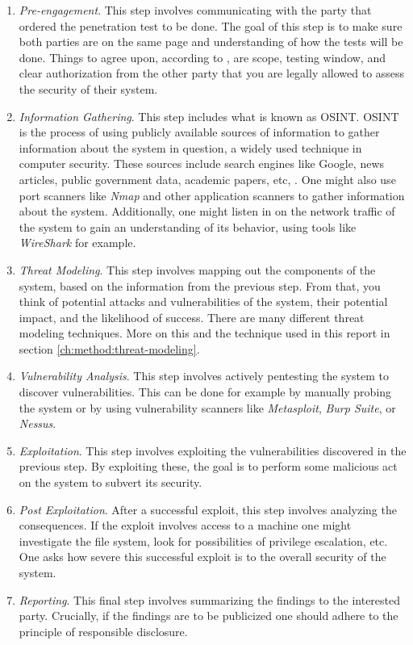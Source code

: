 \begin{enumerate}
    \item \textit{Pre-engagement}. This step involves communicating with the party that ordered the penetration test to be done. The goal of this step is to make sure both parties are on the same page and understanding of how the tests will be done. Things to agree upon, according to \citeauthor{weidman2014}, are scope, testing window, and clear authorization from the other party that you are legally allowed to assess the security of their system.
    \item \textit{Information Gathering}. This step includes what is known as \gls{OSINT}. \gls{OSINT} is the process of using publicly available sources of information to gather information about the system in question, a widely used technique in computer security. These sources include search engines like Google, news articles, public government data, academic papers, etc, \cite{steele2007open}. One might also use port scanners like \textit{Nmap} and other application scanners to gather information about the system. Additionally, one might listen in on the network traffic of the system to gain an understanding of its behavior, using tools like \textit{WireShark} for example.
    \item \textit{Threat Modeling}. This step involves mapping out the components of the system, based on the information from the previous step. From that, you think of potential attacks and vulnerabilities of the system, their potential impact, and the likelihood of success. There are many different threat modeling techniques. More on this and the technique used in this report in section \ref{ch:method:threat-modeling}.
    \item \textit{Vulnerability Analysis}. This step involves actively pentesting the system to discover vulnerabilities. This can be done for example by manually probing the system or by using vulnerability scanners like \textit{Metasploit}, \textit{Burp Suite}, or \textit{Nessus}.
    \item \textit{Exploitation}. This step involves exploiting the vulnerabilities discovered in the previous step. By exploiting these, the goal is to perform some malicious act on the system to subvert its security.
    \item \textit{Post Exploitation}. After a successful exploit, this step involves analyzing the consequences. If the exploit involves access to a machine one might investigate the file system, look for possibilities of privilege escalation, etc. One asks how severe this successful exploit is to the overall security of the system.
    \item \textit{Reporting}. This final step involves summarizing the findings to the interested party. Crucially, if the findings are to be publicized one should adhere to the principle of responsible disclosure.
\end{enumerate}
